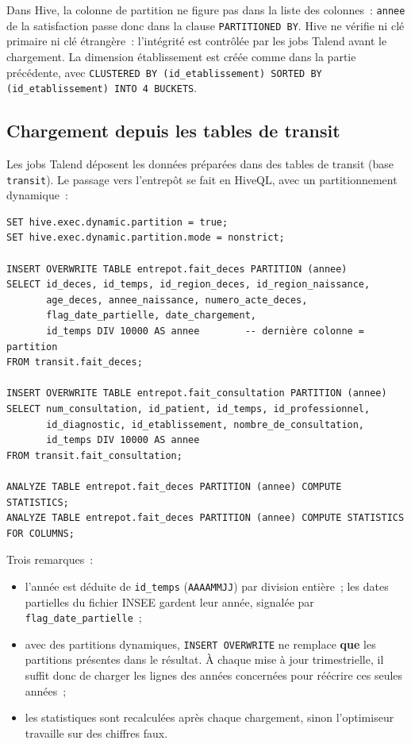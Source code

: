 \noindent Dans Hive, la colonne de partition ne figure pas dans la liste des colonnes~: \texttt{annee} de la satisfaction passe donc dans la clause \texttt{PARTITIONED BY}. Hive ne vérifie ni clé primaire ni clé étrangère~: l'intégrité est contrôlée par les jobs Talend avant le chargement. La dimension établissement est créée comme dans la partie précédente, avec \texttt{CLUSTERED BY (id\_etablissement) SORTED BY (id\_etablissement) INTO 4 BUCKETS}.

\subsection{Chargement depuis les tables de transit}

\noindent Les jobs Talend déposent les données préparées dans des tables de transit (base \texttt{transit}). Le passage vers l'entrepôt se fait en HiveQL, avec un partitionnement dynamique~:

\begin{center}
\begin{minipage}{0.92\textwidth}
\begin{tcolorbox}[colback=title2!6,colframe=title1,boxsep=2pt]
\begin{verbatim}
SET hive.exec.dynamic.partition = true;
SET hive.exec.dynamic.partition.mode = nonstrict;

INSERT OVERWRITE TABLE entrepot.fait_deces PARTITION (annee)
SELECT id_deces, id_temps, id_region_deces, id_region_naissance,
       age_deces, annee_naissance, numero_acte_deces,
       flag_date_partielle, date_chargement,
       id_temps DIV 10000 AS annee        -- dernière colonne = partition
FROM transit.fait_deces;

INSERT OVERWRITE TABLE entrepot.fait_consultation PARTITION (annee)
SELECT num_consultation, id_patient, id_temps, id_professionnel,
       id_diagnostic, id_etablissement, nombre_de_consultation,
       id_temps DIV 10000 AS annee
FROM transit.fait_consultation;

ANALYZE TABLE entrepot.fait_deces PARTITION (annee) COMPUTE STATISTICS;
ANALYZE TABLE entrepot.fait_deces PARTITION (annee) COMPUTE STATISTICS FOR COLUMNS;
\end{verbatim}
\end{tcolorbox}
\end{minipage}
\end{center}

\noindent Trois remarques~:
\begin{itemize}
	\item l'année est déduite de \texttt{id\_temps} (\texttt{AAAAMMJJ}) par division entière~; les dates partielles du fichier INSEE gardent leur année, signalée par \texttt{flag\_date\_partielle}~;
	\item avec des partitions dynamiques, \texttt{INSERT OVERWRITE} ne remplace \textbf{que} les partitions présentes dans le résultat. À chaque mise à jour trimestrielle, il suffit donc de charger les lignes des années concernées pour réécrire ces seules années~;
	\item les statistiques sont recalculées après chaque chargement, sinon l'optimiseur travaille sur des chiffres faux.
\end{itemize}

